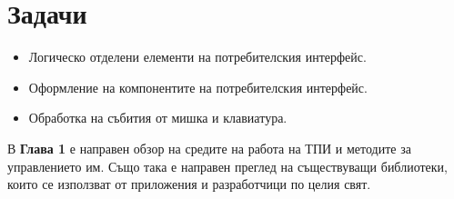 \section*{Задачи}
        \begin{itemize}
                \item Логическо отделени елементи на потребителския интерфейс.
                \item Оформление на компонентите на потребителския интерфейс.
                \item Обработка на събития от мишка и клавиатура.
        \end{itemize}
\vspace{10mm}

В \textbf{Глава 1} е направен обзор на средите на работа на ТПИ и методите за
управлението им. Също така е направен преглед на съществуващи библиотеки, които
се използват от приложения и разработчици по целия свят.


